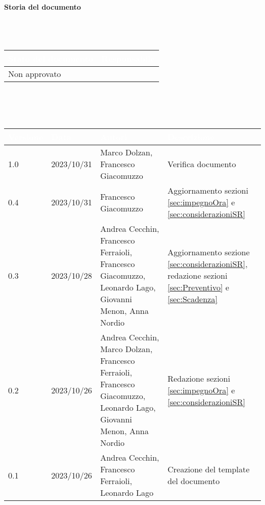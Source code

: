 \documentclass[12pt]{article}
\begin{document}
\begin{huge}
    \textbf{Storia del documento} \\ \\ \\ \\
\end{huge}
\begingroup
\setlength{\tabcolsep}{10pt}
\renewcommand{\arraystretch}{1.5}
\begin{tabularx}{\textwidth}{| X | X |}
    \hline
    \rowcolor{headerrow} \textbf{\textcolor{white}{Stato del documento}} & \textbf{\textcolor{white}{Responsabile}} \\
    \hline
    Non approvato & \\
    \hline
\end{tabularx}
\\ \\ \\
\begin{tabularx}{\textwidth}{| l | l | X | X |}
    \hline
    \rowcolor{headerrow} \textbf{\textcolor{white}{Versione}} & \textbf{\textcolor{white}{Data}} & \textbf{\textcolor{white}{Autori}} & \textbf{\textcolor{white}{Descrizione}} \\
    \hline
    1.0 & 2023/10/31 & Marco Dolzan, Francesco Giacomuzzo & Verifica documento \\
    \hline
    0.4 & 2023/10/31 & Francesco Giacomuzzo & Aggiornamento sezioni \ref{sec:impegnoOra} e \ref{sec:considerazioniSR} \\
    \hline
    0.3 & 2023/10/28 & Andrea Cecchin, Francesco Ferraioli, Francesco Giacomuzzo, Leonardo Lago, Giovanni Menon, Anna Nordio & Aggiornamento sezione \ref{sec:considerazioniSR}, redazione sezioni \ref{sec:Preventivo} e \ref{sec:Scadenza} \\
    \hline
    0.2 & 2023/10/26 & Andrea Cecchin, Marco Dolzan, Francesco Ferraioli, Francesco Giacomuzzo, Leonardo Lago, Giovanni Menon, Anna Nordio & Redazione sezioni \ref{sec:impegnoOra} e \ref{sec:considerazioniSR} \\
    \hline
    0.1 & 2023/10/26 &  Andrea Cecchin, Francesco Ferraioli, Leonardo Lago & Creazione del template del documento\\
    \hline
\end{tabularx}
\endgroup

\cleardoublepage
\endgroup
\end{document}
